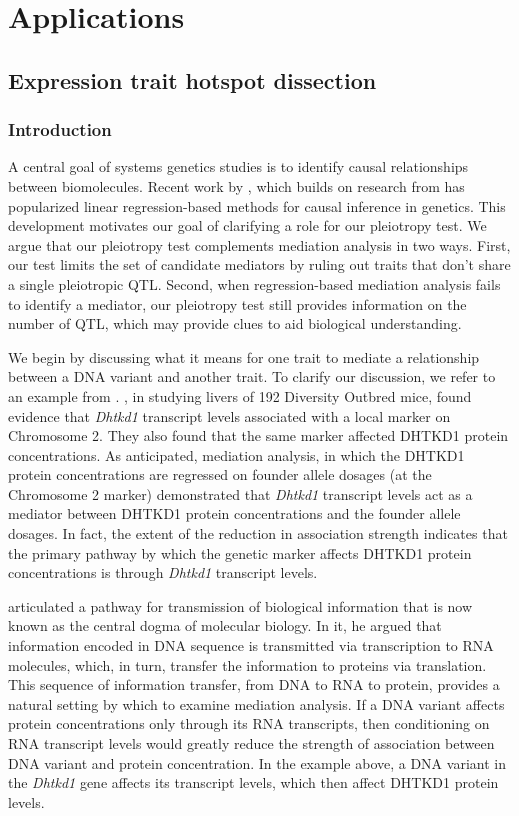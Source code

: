 \documentclass{book}
\begin{document}


\chapter{Applications}
\section{Expression trait hotspot dissection}
\subsection{Introduction}

A central goal of systems genetics studies is to identify causal relationships between biomolecules. Recent work by \citet{chick2016defining}, which builds on research from \citet{baron1986moderator} has popularized linear regression-based methods for causal inference in genetics. This development motivates our goal of clarifying a role for our pleiotropy test. We argue that our pleiotropy test complements mediation analysis in two ways. First, our test limits the set of candidate mediators by ruling out traits that don't share a single pleiotropic QTL. Second, when regression-based mediation analysis fails to identify a mediator, our pleiotropy test still provides information on the number of QTL, which may provide clues to aid biological understanding.


We begin by discussing what it means for one trait to mediate a relationship between a DNA variant and another trait. To clarify our discussion, we refer to an example from \citet{chick2016defining}. \citet{chick2016defining}, in studying livers of 192 Diversity Outbred mice, found evidence that \emph{Dhtkd1} transcript levels associated with a local marker on Chromosome 2. They also found that the same marker affected DHTKD1 protein concentrations. 
As anticipated, mediation analysis, in which the DHTKD1 protein concentrations are regressed on founder allele dosages (at the Chromosome 2 marker) demonstrated that \emph{Dhtkd1} transcript levels act as a mediator between DHTKD1 protein concentrations and the founder allele dosages. In fact, the extent of the reduction in association strength indicates that the primary pathway by which the genetic marker affects DHTKD1 protein concentrations is through \emph{Dhtkd1} transcript levels.

\citet{crick1958protein} articulated a pathway for transmission of biological information that is now known as the central dogma of molecular biology. In it, he argued that information encoded in DNA sequence is transmitted via transcription to RNA molecules, which, in turn, transfer the information to proteins via translation. This sequence of information transfer, from DNA to RNA to protein, provides a natural setting by which to examine mediation analysis. If a DNA variant affects protein concentrations only through its RNA transcripts, then conditioning on RNA transcript levels would greatly reduce the strength of association between DNA variant and protein concentration. In the example above, a DNA variant in the \emph{Dhtkd1} gene affects its transcript levels, which then affect DHTKD1 protein levels.
\end{document}

